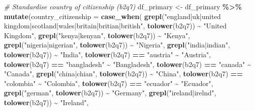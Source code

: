 \documentclass[
]{article}
\newenvironment{Shaded}{\begin{snugshade}}{\end{snugshade}}
\newcommand{\AttributeTok}[1]{\textcolor[rgb]{0.13,0.29,0.53}{#1}}
\newcommand{\CommentTok}[1]{\textcolor[rgb]{0.56,0.35,0.01}{\textit{#1}}}
\newcommand{\FunctionTok}[1]{\textcolor[rgb]{0.13,0.29,0.53}{\textbf{#1}}}
\newcommand{\NormalTok}[1]{#1}
\newcommand{\OtherTok}[1]{\textcolor[rgb]{0.56,0.35,0.01}{#1}}
\newcommand{\SpecialCharTok}[1]{\textcolor[rgb]{0.81,0.36,0.00}{\textbf{#1}}}
\newcommand{\StringTok}[1]{\textcolor[rgb]{0.31,0.60,0.02}{#1}}
\begin{document}
\begin{Shaded}
\begin{Highlighting}[]
\CommentTok{\# Standardise country of citizenship (b2q7)}
\NormalTok{df\_primary }\OtherTok{\textless{}{-}}\NormalTok{ df\_primary }\SpecialCharTok{\%\textgreater{}\%}
  \FunctionTok{mutate}\NormalTok{(}\AttributeTok{country\_citizenship =} \FunctionTok{case\_when}\NormalTok{(}
    \FunctionTok{grepl}\NormalTok{(}\StringTok{"england|uk|united kingdom|scotland|wales|britain|britian|british"}\NormalTok{,}
          \FunctionTok{tolower}\NormalTok{(b2q7)) }\SpecialCharTok{\textasciitilde{}} \StringTok{"United Kingdom"}\NormalTok{,}
    \FunctionTok{grepl}\NormalTok{(}\StringTok{"kenya|kenyan"}\NormalTok{, }\FunctionTok{tolower}\NormalTok{(b2q7))              }\SpecialCharTok{\textasciitilde{}} \StringTok{"Kenya"}\NormalTok{,}
    \FunctionTok{grepl}\NormalTok{(}\StringTok{"nigeria|nigerian"}\NormalTok{, }\FunctionTok{tolower}\NormalTok{(b2q7))          }\SpecialCharTok{\textasciitilde{}} \StringTok{"Nigeria"}\NormalTok{,}
    \FunctionTok{grepl}\NormalTok{(}\StringTok{"india|indian"}\NormalTok{, }\FunctionTok{tolower}\NormalTok{(b2q7))              }\SpecialCharTok{\textasciitilde{}} \StringTok{"India"}\NormalTok{,}
    \FunctionTok{tolower}\NormalTok{(b2q7) }\SpecialCharTok{==} \StringTok{"austria"}                        \SpecialCharTok{\textasciitilde{}} \StringTok{"Austria"}\NormalTok{,}
    \FunctionTok{tolower}\NormalTok{(b2q7) }\SpecialCharTok{==} \StringTok{"bangladesh"}                     \SpecialCharTok{\textasciitilde{}} \StringTok{"Bangladesh"}\NormalTok{,}
    \FunctionTok{tolower}\NormalTok{(b2q7) }\SpecialCharTok{==} \StringTok{"canada"}                         \SpecialCharTok{\textasciitilde{}} \StringTok{"Canada"}\NormalTok{,}
    \FunctionTok{grepl}\NormalTok{(}\StringTok{"china|chian"}\NormalTok{, }\FunctionTok{tolower}\NormalTok{(b2q7))               }\SpecialCharTok{\textasciitilde{}} \StringTok{"China"}\NormalTok{,}
    \FunctionTok{tolower}\NormalTok{(b2q7) }\SpecialCharTok{==} \StringTok{"colombia"}                       \SpecialCharTok{\textasciitilde{}} \StringTok{"Colombia"}\NormalTok{,}
    \FunctionTok{tolower}\NormalTok{(b2q7) }\SpecialCharTok{==} \StringTok{"ecuador"}                        \SpecialCharTok{\textasciitilde{}} \StringTok{"Ecuador"}\NormalTok{,}
    \FunctionTok{grepl}\NormalTok{(}\StringTok{"german"}\NormalTok{, }\FunctionTok{tolower}\NormalTok{(b2q7))                    }\SpecialCharTok{\textasciitilde{}} \StringTok{"Germany"}\NormalTok{,}
    \FunctionTok{grepl}\NormalTok{(}\StringTok{"ireland|irelnd"}\NormalTok{, }\FunctionTok{tolower}\NormalTok{(b2q7))            }\SpecialCharTok{\textasciitilde{}} \StringTok{"Ireland"}\NormalTok{,}

\end{Highlighting}
\end{Shaded}
\end{document}

